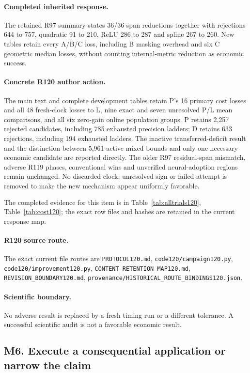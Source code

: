 \paragraph{Completed inherited response.}
The retained R97 summary states 36/36 span reductions together with rejections 644 to 757, quadratic 91 to 210, ReLU 286 to 287 and spline 267 to 260. New tables retain every A/B/C loss, including B masking overhead and six C geometric median losses, without counting internal-metric reduction as economic success.
\paragraph{Concrete R120 author action.}
The main text and complete development tables retain P's 16 primary cost losses and all 48 fresh-clock losses to L, nine exact and seven unresolved P/L mean comparisons, and all six zero-gain online population groups. P retains 2,257 rejected candidates, including 785 exhausted precision ladders; D retains 633 rejections, including 194 exhausted ladders. The inactive transferred-deficit result and the distinction between 5,961 active mixed bounds and only one necessary economic candidate are reported directly. The older R97 residual-span mismatch, adverse R119 phases, conventional wins and unverified neural-adoption regions remain unchanged. No discarded clock, unresolved sign or failed attempt is removed to make the new mechanism appear uniformly favorable.

The completed evidence for this item is in Table~\ref{tab:alltrials120}, Table~\ref{tab:cost120}; the exact row files and hashes are retained in the current response map.
\paragraph{R120 source route.}
The exact current file routes are \nolinkurl{PROTOCOL120.md}, \nolinkurl{code120/campaign120.py}, \nolinkurl{code120/improvement120.py}, \nolinkurl{CONTENT_RETENTION_MAP120.md}, \nolinkurl{REVISION_BOUNDARY120.md}, \nolinkurl{provenance/HISTORICAL_ROUTE_BINDINGS120.json}.
\paragraph{Scientific boundary.}
No adverse result is replaced by a fresh timing run or a different tolerance. A successful scientific audit is not a favorable economic result.

\subsection{M6. Execute a consequential application or narrow the claim}
\label{response120:M6}
